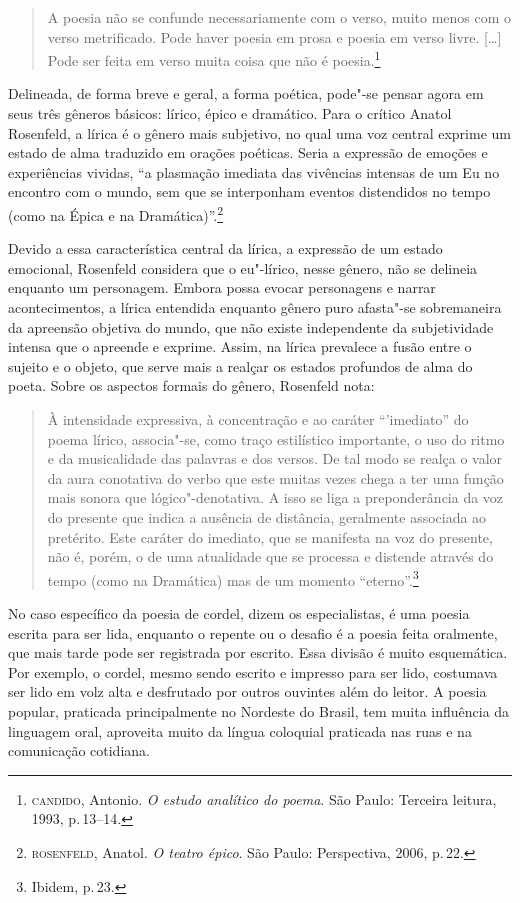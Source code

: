 \documentclass[11pt]{extarticle}
\begin{document}
\begin{quote}
A poesia não se confunde necessariamente com o verso, muito menos com o verso metrificado. Pode haver poesia em prosa e poesia em verso livre. [\ldots]
Pode ser feita em verso muita coisa que não é poesia.\footnote{\textsc{candido}, Antonio. \textit{O estudo analítico do poema}. São Paulo: Terceira leitura, 1993, p.\,13--14.}
\end{quote}

Delineada, de forma breve e geral, a forma poética, pode"-se pensar agora em seus três gêneros básicos: lírico, épico e dramático.
Para o crítico Anatol Rosenfeld, a lírica é o gênero mais subjetivo, no qual uma voz central exprime um estado de alma traduzido em orações poéticas.
Seria a expressão de emoções e experiências vividas, ``a plasmação imediata das vivências intensas de um Eu no encontro com o mundo, sem que se interponham eventos distendidos no tempo (como na Épica e na Dramática)''.\footnote{\textsc{rosenfeld}, Anatol. \textit{O teatro épico}. São Paulo: Perspectiva, 2006, p.\,22.}

Devido a essa característica central da lírica, a expressão de um estado emocional, Rosenfeld considera que o eu"-lírico, nesse gênero, não se delineia enquanto um personagem. Embora possa evocar personagens e narrar acontecimentos, a lírica entendida enquanto gênero puro afasta"-se sobremaneira da apreensão objetiva do mundo, que não existe independente da subjetividade intensa que o apreende e exprime. Assim, na lírica prevalece a fusão entre o sujeito e o objeto, que serve mais a realçar os estados profundos de alma do poeta.
Sobre os aspectos formais do gênero, Rosenfeld nota:

\begin{quote}
À intensidade expressiva, à concentração e ao caráter ``'imediato'' do poema lírico, associa"-se, como traço estilístico importante, o uso do ritmo e da musicalidade das palavras e dos versos. De tal modo se realça o valor da aura conotativa do verbo que este muitas vezes chega a ter uma função mais sonora que lógico"-denotativa. A isso se liga a preponderância da voz do presente que indica a ausência de distância, geralmente associada ao pretérito. Este caráter do imediato, que se manifesta na voz do presente, não é, porém, o de uma atualidade que se processa e distende através do tempo (como na Dramática) mas de um momento ``eterno''.\footnote{Ibidem, p.\,23.}
\end{quote}

No caso específico da poesia de cordel, dizem os especialistas, é uma poesia escrita para
ser lida, enquanto o repente ou o desafio é a poesia feita oralmente, que mais tarde pode
ser registrada por escrito. Essa divisão é muito esquemática. Por exemplo, o
cordel, mesmo sendo escrito e impresso para ser lido, costumava ser lido em
volz alta e desfrutado por outros ouvintes além do leitor. A poesia popular,
praticada principalmente no Nordeste do Brasil, tem muita influência da
linguagem oral, aproveita muito da língua coloquial praticada nas ruas e na
comunicação cotidiana. 
\end{document}
